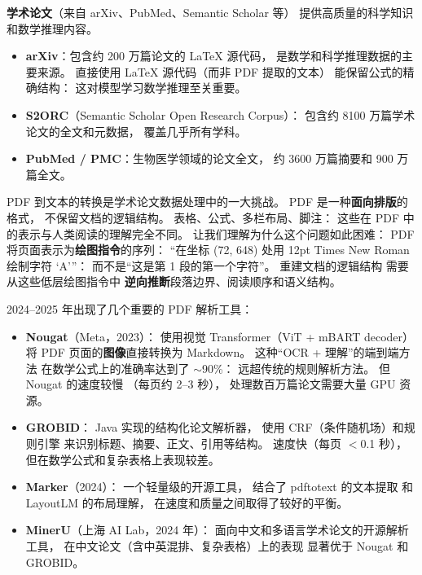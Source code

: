 \textbf{学术论文}（来自 arXiv、PubMed、Semantic Scholar 等）
提供高质量的科学知识和数学推理内容。

\begin{itemize}[noitemsep]
  \item \textbf{arXiv}：包含约 200 万篇论文的 \LaTeX{} 源代码，
        是数学和科学推理数据的主要来源。
        直接使用 \LaTeX{} 源代码（而非 PDF 提取的文本）
        能保留公式的精确结构：
        这对模型学习数学推理至关重要。
  \item \textbf{S2ORC}（Semantic Scholar Open Research Corpus）：
        包含约 8100 万篇学术论文的全文和元数据，
        覆盖几乎所有学科。
  \item \textbf{PubMed / PMC}：生物医学领域的论文全文，
        约 3600 万篇摘要和 900 万篇全文。
\end{itemize}

PDF 到文本的转换是学术论文数据处理中的一大挑战。
PDF 是一种\textbf{面向排版}的格式，
不保留文档的逻辑结构。
表格、公式、多栏布局、脚注：
这些在 PDF 中的表示与人类阅读的理解完全不同。
让我们理解为什么这个问题如此困难：
PDF 将页面表示为\textbf{绘图指令}的序列：
“在坐标 (72, 648) 处用 12pt Times New Roman 绘制字符 `A'\thinspace”：
而不是“这是第 1 段的第一个字符”。
重建文档的逻辑结构
需要从这些低层绘图指令中
\textbf{逆向推断}段落边界、阅读顺序和语义结构。

2024--2025 年出现了几个重要的 PDF 解析工具：

\begin{itemize}[noitemsep]
  \item \textbf{Nougat}（Meta，2023）：
        使用视觉 Transformer（ViT + mBART decoder）
        将 PDF 页面的\textbf{图像}直接转换为 Markdown。
        这种“OCR + 理解”的端到端方法
        在数学公式上的准确率达到了 $\sim$90\%：
        远超传统的规则解析方法。
        但 Nougat 的速度较慢
        （每页约 2--3 秒），
        处理数百万篇论文需要大量 GPU 资源。
  \item \textbf{GROBID}：
        Java 实现的结构化论文解析器，
        使用 CRF（条件随机场）和规则引擎
        来识别标题、摘要、正文、引用等结构。
        速度快（每页 $<$0.1 秒），
        但在数学公式和复杂表格上表现较差。
  \item \textbf{Marker}（2024）：
        一个轻量级的开源工具，
        结合了 pdftotext 的文本提取
        和 LayoutLM 的布局理解，
        在速度和质量之间取得了较好的平衡。
  \item \textbf{MinerU}（上海 AI Lab，2024 年）：%
        面向中文和多语言学术论文的开源解析工具，
        在中文论文（含中英混排、复杂表格）上的表现
        显著优于 Nougat 和 GROBID。
\end{itemize}

